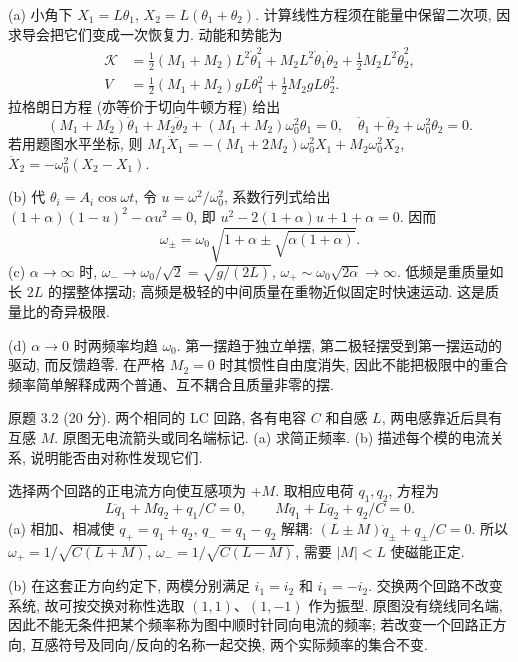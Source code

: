 \begin{solution}
(a) 小角下 $X_1=L\theta_1$, $X_2=L(\theta_1+\theta_2)$. 计算线性方程须在能量中保留二次项, 因求导会把它们变成一次恢复力. 动能和势能为
\begin{align*}
\mathcal K&=\tfrac12(M_1+M_2)L^2\dot\theta_1^2+M_2L^2\dot\theta_1\dot\theta_2+\tfrac12M_2L^2\dot\theta_2^2,\\
V&=\tfrac12(M_1+M_2)gL\theta_1^2+\tfrac12M_2gL\theta_2^2.
\end{align*}
拉格朗日方程 (亦等价于切向牛顿方程) 给出
\[
(M_1+M_2)\ddot\theta_1+M_2\ddot\theta_2+(M_1+M_2)\omega_0^2\theta_1=0,\quad
\ddot\theta_1+\ddot\theta_2+\omega_0^2\theta_2=0.
\]
若用题图水平坐标, 则 $M_1\ddot X_1=-(M_1+2M_2)\omega_0^2X_1+M_2\omega_0^2X_2$, $\ddot X_2=-\omega_0^2(X_2-X_1)$.

(b) 代 $\theta_i=A_i\cos\omega t$, 令 $u=\omega^2/\omega_0^2$, 系数行列式给出 $(1+\alpha)(1-u)^2-\alpha u^2=0$, 即 $u^2-2(1+\alpha)u+1+\alpha=0$. 因而
\[
\omega_\pm=\omega_0\sqrt{1+\alpha\pm\sqrt{\alpha(1+\alpha)}}.
\]
(c) $\alpha\to\infty$ 时, $\omega_-\to\omega_0/\sqrt2=\sqrt{g/(2L)}$, $\omega_+\sim\omega_0\sqrt{2\alpha}\to\infty$. 低频是重质量如长 $2L$ 的摆整体摆动; 高频是极轻的中间质量在重物近似固定时快速运动. 这是质量比的奇异极限.

(d) $\alpha\to0$ 时两频率均趋 $\omega_0$. 第一摆趋于独立单摆, 第二极轻摆受到第一摆运动的驱动, 而反馈趋零. 在严格 $M_2=0$ 时其惯性自由度消失, 因此不能把极限中的重合频率简单解释成两个普通、互不耦合且质量非零的摆.
\end{solution}
\begin{exercise}\label{ps:3.2}
原题 3.2 (20 分). 两个相同的 LC 回路, 各有电容 $C$ 和自感 $L$, 两电感靠近后具有互感 $M$. 原图无电流箭头或同名端标记. (a) 求简正频率. (b) 描述每个模的电流关系, 说明能否由对称性发现它们.
\end{exercise}
\begin{solution}
选择两个回路的正电流方向使互感项为 $+M$. 取相应电荷 $q_1,q_2$, 方程为
\[
L\ddot q_1+M\ddot q_2+q_1/C=0,\qquad
M\ddot q_1+L\ddot q_2+q_2/C=0.
\]
(a) 相加、相减使 $q_+=q_1+q_2$, $q_-=q_1-q_2$ 解耦: $(L\pm M)\ddot q_\pm+q_\pm/C=0$. 所以 $\omega_+=1/\sqrt{C(L+M)}$, $\omega_-=1/\sqrt{C(L-M)}$, 需要 $|M|<L$ 使磁能正定.

(b) 在这套正方向约定下, 两模分别满足 $i_1=i_2$ 和 $i_1=-i_2$. 交换两个回路不改变系统, 故可按交换对称性选取 $(1,1)$、$(1,-1)$ 作为振型. 原图没有绕线同名端, 因此不能无条件把某个频率称为图中顺时针同向电流的频率; 若改变一个回路正方向, 互感符号及同向/反向的名称一起交换, 两个实际频率的集合不变.
\end{solution}
